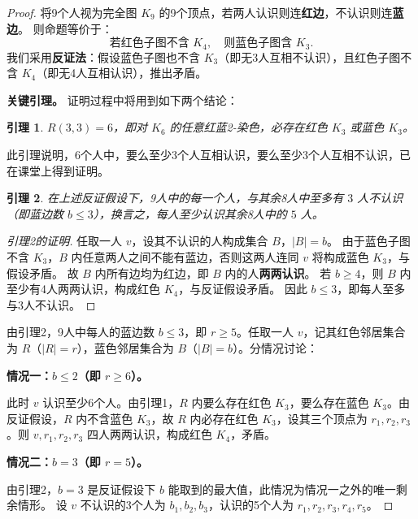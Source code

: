 \documentclass[utf8]{ctexart}
\theoremstyle{mystyle}
\newtheorem{lemma}{引理}
\begin{document}
\begin{proof}

将9个人视为完全图 $K_9$ 的9个顶点，若两人认识则连\textbf{红边}，不认识则连\textbf{蓝边}。
则命题等价于：
\[
  \text{若红色子图不含 } K_4,\quad \text{则蓝色子图含 } K_3.
\]
我们采用\textbf{反证法}：假设蓝色子图也不含 $K_3$（即无3人互相不认识），且红色子图不含 $K_4$（即无4人互相认识），推出矛盾。

\medskip

\textbf{关键引理。}
证明过程中将用到如下两个结论：

\begin{lemma}
$R(3,3) = 6$，即对 $K_6$ 的任意红蓝2-染色，必存在红色 $K_3$ 或蓝色 $K_3$。
\end{lemma}

此引理说明，6个人中，要么至少3个人互相认识，要么至少3个人互相不认识，已在课堂上得到证明。

\begin{lemma}
在上述反证假设下，9人中的每一个人，与其余8人中至多有 $3$ 人不认识（即蓝边数 $b \leq 3$），换言之，每人至少认识其余8人中的 $5$ 人。
\end{lemma}

\begin{proof}[引理2的证明]
任取一人 $v$，设其不认识的人构成集合 $B$，$|B| = b$。
由于蓝色子图不含 $K_3$，$B$ 内任意两人之间不能有蓝边，否则这两人连同 $v$ 将构成蓝色 $K_3$，与假设矛盾。
故 $B$ 内所有边均为红边，即 $B$ 内的人\textbf{两两认识}。
若 $b \geq 4$，则 $B$ 内至少有4人两两认识，构成红色 $K_4$，与反证假设矛盾。
因此 $b \leq 3$，即每人至多与3人不认识。
\end{proof}

\medskip

由引理2，9人中每人的蓝边数 $b \leq 3$，即 $r \geq 5$。任取一人 $v$，记其红色邻居集合为 $R$（$|R|=r$），蓝色邻居集合为 $B$（$|B|=b$）。分情况讨论：

\medskip

\textbf{情况一：$b \leq 2$（即 $r \geq 6$）。}

此时 $v$ 认识至少6个人。由引理1，$R$ 内要么存在红色 $K_3$，要么存在蓝色 $K_3$。由反证假设，$R$ 内不含蓝色 $K_3$，故 $R$ 内必存在红色 $K_3$，设其三个顶点为 $r_1, r_2, r_3$。则 $v, r_1, r_2, r_3$ 四人两两认识，构成红色 $K_4$，矛盾。

\medskip

\textbf{情况二：$b = 3$（即 $r = 5$）。}

由引理2，$b=3$ 是反证假设下 $b$ 能取到的最大值，此情况为情况一之外的唯一剩余情形。
设 $v$ 不认识的3个人为 $b_1, b_2, b_3$，认识的5个人为 $r_1, r_2, r_3, r_4, r_5$。


\end{proof}
\end{document}

